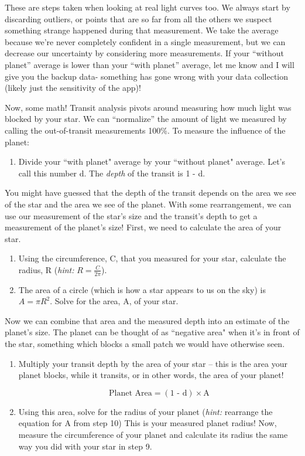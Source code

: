 \documentclass[11pt]{article}
\begin{document}
\noindent
These are steps taken when looking at real light curves too. We always start by discarding outliers, or points that are so far from all the others we suspect something strange happened during that measurement. We take the average because we’re never completely confident in a single measurement, but we can decrease our uncertainty by considering more measurements. If your “without planet” average is lower than your “with planet” average, let me know and I will give you the backup data- something has gone wrong with your data collection (likely just the sensitivity of the app)! 

\medskip \noindent
Now, some math! Transit analysis pivots around measuring how much light was blocked by your star. We can “normalize” the amount of light we measured by calling the out-of-transit measurements 100\%. To measure the influence of the planet:
\begin{enumerate}[label=Step \arabic*:,resume]
    \item Divide your ``with planet" average by your ``without planet" average.  Let's call this number d.  The \textit{depth} of the transit is 1 - d.
\end{enumerate}

\noindent
You might have guessed that the depth of the transit depends on the area we see of the star and the area we see of the planet. With some rearrangement, we can use our measurement of the star’s size and the transit’s depth to get a measurement of the planet’s size! First, we need to calculate the area of your star.

\begin{enumerate}[label=Step \arabic*:,resume]
    \item Using the circumference, C, that you measured for your star, calculate the radius, R (\textit{hint: }$R = \frac{C}{2\pi}$).
    \item The area of a circle (which is how a star appears to us on the sky) is $A = \pi R^2$.  Solve for the area, A, of your star.
\end{enumerate}

\medskip \noindent
Now we can combine that area and the measured depth into an estimate of the planet's size. The planet can be thought of as ``negative area" when it's in front of the star, something which blocks a small patch we would have otherwise seen. 
\begin{enumerate}[label=Step \arabic*:,resume]
    \item Multiply your transit depth by the area of your star -- this is the area your planet blocks, while it transits, or in other words, the area of your planet!

    $$\text{Planet Area} = (\text{1 - d}) \times \text{A}$$
    
    \item Using this area, solve for the radius of your planet (\textit{hint: }rearrange the equation for A from step 10) This is your measured planet radius! Now, measure the circumference of your planet and calculate its radius the same way you did with your star in step 9.

\end{enumerate}
\end{document}
